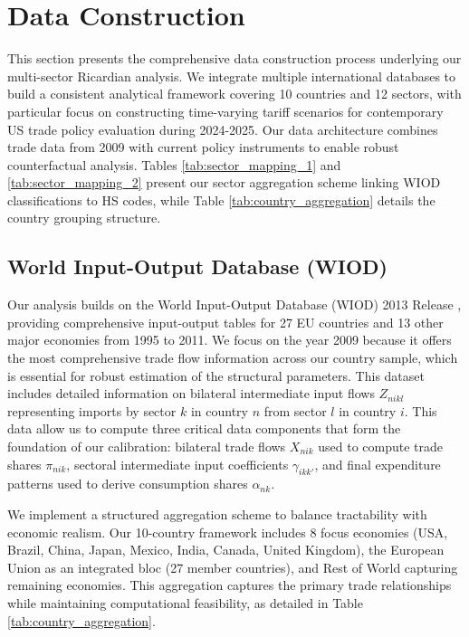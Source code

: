 \section{Data Construction}

This section presents the comprehensive data construction process underlying our multi-sector Ricardian analysis. We integrate multiple international databases to build a consistent analytical framework covering 10 countries and 12 sectors, with particular focus on constructing time-varying tariff scenarios for contemporary US trade policy evaluation during 2024-2025. Our data architecture combines trade data from 2009 with current policy instruments to enable robust counterfactual analysis. Tables \ref{tab:sector_mapping_1} and \ref{tab:sector_mapping_2} present our sector aggregation scheme linking WIOD classifications to HS codes, while Table \ref{tab:country_aggregation} details the country grouping structure.

\subsection{World Input-Output Database (WIOD)}

Our analysis builds on the World Input-Output Database (WIOD) 2013 Release \citep{timmer2015illustrated}, providing comprehensive input-output tables for 27 EU countries and 13 other major economies from 1995 to 2011. We focus on the year 2009 because it offers the most comprehensive trade flow information across our country sample, which is essential for robust estimation of the structural parameters. This dataset includes detailed information on bilateral intermediate input flows $Z_{nikl}$ representing imports by sector $k$ in country $n$ from sector $l$ in country $i$. This data allow us to compute three critical data components that form the foundation of our calibration: bilateral trade flows $X_{nik}$ used to compute trade shares $\pi_{nik}$, sectoral intermediate input coefficients $\gamma_{ikk'}$, and final expenditure patterns used to derive consumption shares $\alpha_{nk}$.

We implement a structured aggregation scheme to balance tractability with economic realism. Our 10-country framework includes 8 focus economies (USA, Brazil, China, Japan, Mexico, India, Canada, United Kingdom), the European Union as an integrated bloc (27 member countries), and Rest of World capturing remaining economies. This aggregation captures the primary trade relationships while maintaining computational feasibility, as detailed in Table \ref{tab:country_aggregation}. 

